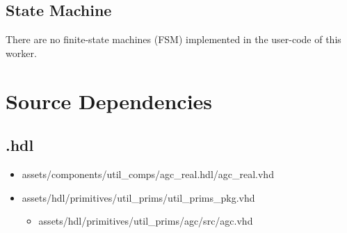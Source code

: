 \subsection*{State Machine}
\begin{flushleft}
	There are no finite-state machines (FSM) implemented in the user-code of this worker.
\end{flushleft}

\section*{Source Dependencies}
\subsection*{\comp.hdl}
\begin{itemize}
	\item assets/components/util\_comps/agc\_real.hdl/agc\_real.vhd
	\item assets/hdl/primitives/util\_prims/util\_prims\_pkg.vhd
	\begin{itemize}
		\item assets/hdl/primitives/util\_prims/agc/src/agc.vhd
	\end{itemize}
\end{itemize}

